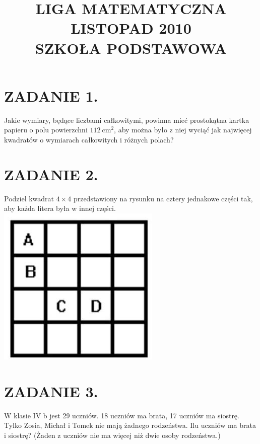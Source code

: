 \documentclass[10pt]{article}
\title{LIGA MATEMATYCZNA \\
 LISTOPAD 2010 \\
 SZKOŁA PODSTAWOWA }
\author{}
\date{}
\begin{document}
\maketitle
\section*{ZADANIE 1.}
Jakie wymiary, będące liczbami całkowitymi, powinna mieć prostokątna kartka papieru o polu powierzchni \(112 \mathrm{~cm}^{2}\), aby można było z niej wyciąć jak najwięcej kwadratów o wymiarach całkowitych i różnych polach?

\section*{ZADANIE 2.}
Podziel kwadrat \(4 \times 4\) przedstawiony na rysunku na cztery jednakowe części tak, aby każda litera była w innej części.\\
\includegraphics[max width=\textwidth, center]{2024_11_21_75ffe54ddbccdee3aceag-1(1)}

\section*{ZADANIE 3.}
W klasie IV b jest 29 uczniów. 18 uczniów ma brata, 17 uczniów ma siostrę. Tylko Zosia, Michał i Tomek nie mają żadnego rodzeństwa. Ilu uczniów ma brata i siostrę? (Żaden z uczniów nie ma więcej niż dwie osoby rodzeństwa.)
\end{document}
